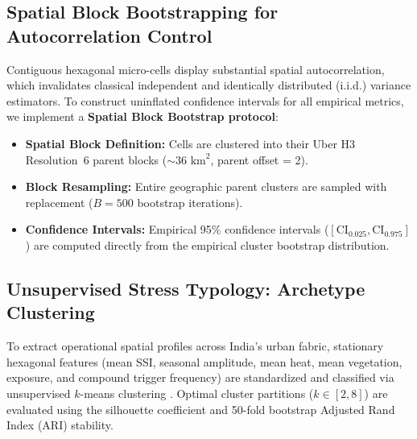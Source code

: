 \subsection{Spatial Block Bootstrapping for Autocorrelation Control}
Contiguous hexagonal micro-cells display substantial spatial autocorrelation, which invalidates classical independent and identically distributed (i.i.d.) variance estimators. To construct uninflated confidence intervals for all empirical metrics, we implement a \textbf{Spatial Block Bootstrap protocol}:
\begin{itemize}
    \item \textbf{Spatial Block Definition:} Cells are clustered into their Uber H3 Resolution~6 parent blocks ($\sim 36\text{ km}^2$, parent offset = 2).
    \item \textbf{Block Resampling:} Entire geographic parent clusters are sampled with replacement ($B = 500$ bootstrap iterations).
    \item \textbf{Confidence Intervals:} Empirical 95\% confidence intervals ($[\text{CI}_{0.025}, \text{CI}_{0.975}]$) are computed directly from the empirical cluster bootstrap distribution.
\end{itemize}

\subsection{Unsupervised Stress Typology: Archetype Clustering}
To extract operational spatial profiles across India's urban fabric, stationary hexagonal features (mean SSI, seasonal amplitude, mean heat, mean vegetation, exposure, and compound trigger frequency) are standardized and classified via unsupervised $k$-means clustering \citep{macqueen1967some}. Optimal cluster partitions ($k \in [2, 8]$) are evaluated using the silhouette coefficient \citep{rousseeuw1987silhouettes} and 50-fold bootstrap Adjusted Rand Index (ARI) stability.
